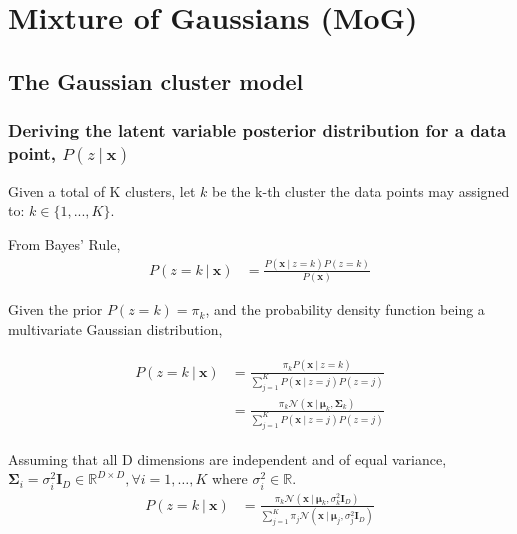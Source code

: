 \documentclass[a4paper,12pt]{article}
\newcommand{\given}{\ | \ }
\newcommand{\x}{\mathbf{x}}
\newcommand{\means}{\bm{\mu}}
\newcommand{\cov}{\mathbf{\Sigma}}
\newcommand{\ident}{\mathbf{I}_D}
\begin{document}
\clearpage
\section{Mixture of Gaussians (MoG)}
\subsection{The Gaussian cluster model}
\subsubsection{Deriving the latent variable posterior distribution for a data point, $P(z \ | \ \mathbf{x})$}

Given a total of K clusters, let $k$ be the k-th cluster the data points may assigned to: $k \in \{1, ..., K \}$.

From Bayes' Rule,
\begin{align}
P(z = k \given \x) 
& = \frac{P(\x \given z = k) P(z = k)}{P(\x)}
\end{align}

Given the prior $P(z = k) = \pi_k$, and the probability density function being a multivariate Gaussian distribution,

\begin{align}
\begin{split}
P(z = k \given \x)
& = \frac{\pi_k P(\x \given z = k)}{\sum_{j=1}^K P(\x \given z = j) P(z = j)} \\
& = \frac{\pi_k \mathcal{N}(\x \given \means_k, \cov_k)}{\sum_{j=1}^K P(\x \given z = j) P(z = j)}
\end{split}
\end{align}

Assuming that all D dimensions are independent and of equal variance, $\cov_i = \sigma_i^2 \ident \in \mathbb{R}^{D \times D}, \forall i = 1, \dots, K$ where $\sigma_i^2 \in \mathbb{R}$.
\begin{align}
P(z = k \given \x) & = \frac{\pi_k \mathcal{N}(\x \given \means_k, \sigma_k^2 \ident)}{\sum_{j=1}^K \pi_j \mathcal{N}(\x \given \means_j, \sigma_j^2 \ident)}
\end{align}

\clearpage
\end{document}
